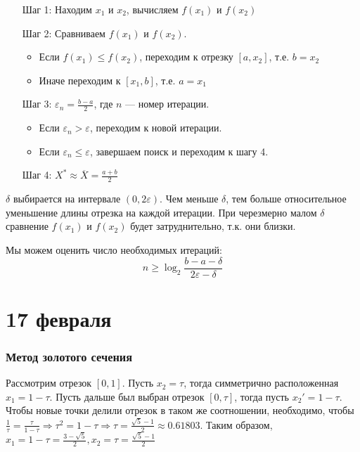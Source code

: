 \begin{itemize}
    \item [Шаг 1:] Находим \(x_1\) и \(x_2\), вычисляем \(f(x_1)\) и \(f(x_2)\)
    \item [Шаг 2:] Сравниваем \(f(x_1)\) и \(f(x_2)\).
          \begin{itemize}
              \item Если \(f(x_1) \leq f(x_2)\), переходим к отрезку \([a, x_2]\), т.е. \(b = x_2\)
              \item Иначе переходим к \([x_1, b]\), т.е. \(a = x_1\)
          \end{itemize}
    \item [Шаг 3:] \(\varepsilon_n = \frac{b - a}{2} \), где \(n\) --- номер итерации.
          \begin{itemize}
              \item Если \(\varepsilon_n > \varepsilon\), переходим к новой итерации.
              \item Если \(\varepsilon_n \leq \varepsilon\), завершаем поиск и переходим к шагу 4.
          \end{itemize}
    \item [Шаг 4:] \(X^* \approx \overline X = \frac{a + b}{2}\)
\end{itemize}

\begin{remark}
    \(\delta\) выбирается на интервале \((0, 2\varepsilon)\). Чем меньше \(\delta\), тем больше относительное уменьшение длины отрезка на каждой итерации. При черезмерно малом \(\delta\) сравнение \(f(x_1)\) и \(f(x_2)\) будет затруднительно, т.к. они близки.
\end{remark}

Мы можем оценить число необходимых итераций:
\[n \geq \log_2 \frac{b - a - \delta}{2\varepsilon - \delta}\]

\chapter{17 февраля}

\subsection{Метод золотого сечения}

Рассмотрим отрезок \([0, 1]\). Пусть \(x_2 = \tau\), тогда симметрично расположенная \(x_1 = 1 - \tau\). Пусть дальше был выбран отрезок \([0, \tau]\), тогда пусть \(x_2' = 1 - \tau\). Чтобы новые точки делили отрезок в таком же соотношении, необходимо, чтобы \(\frac{1}{\tau} = \frac{\tau}{1 - \tau} \Rightarrow \tau^2 = 1 - \tau \Rightarrow \tau = \frac{\sqrt{5} - 1}{2} \approx 0.61803\). Таким образом, \(x_1 = 1 - \tau = \frac{3 - \sqrt{5}}{2}, x_2 = \tau = \frac{\sqrt{5} - 1}{2}\)

